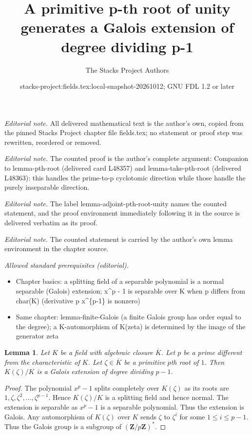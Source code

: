 \documentclass[10pt,a4paper]{amsart}
\title{A primitive p-th root of unity generates a Galois extension of degree dividing p-1}
\author{The Stacks Project Authors}
\date{stacks-project:fields.tex:local-snapshot-20261012; GNU FDL 1.2 or later}
\theoremstyle{plain}
\newtheorem{lemma}[subsection]{Lemma}
\theoremstyle{definition}
\theoremstyle{remark}
\numberwithin{equation}{subsection}
\begin{document}
\maketitle
\noindent\textit{Editorial note.} All delivered mathematical text is the author's own, copied from the pinned Stacks Project chapter file fields.tex; no statement or proof step was rewritten, reordered or removed.\par\medskip
\noindent\textit{Editorial note.} The counted proof is the author's complete argument: Companion to lemma-pth-root (delivered card L48357) and lemma-take-pth-root (delivered L48363): this handles the prime-to-p cyclotomic direction while those handle the purely inseparable direction.\par\medskip
\noindent\textit{Editorial note.} The label lemma-adjoint-pth-root-unity names the counted statement, and the proof environment immediately following it in the source is delivered verbatim as its proof.\par\medskip
\noindent\textit{Editorial note.} The counted statement is carried by the author's own lemma environment in the chapter source.\par\medskip
\noindent\textit{Allowed standard prerequisites (editorial).}\begin{itemize}
\item Chapter basics: a splitting field of a separable polynomial is a normal separable (Galois) extension; x\textasciicircum{}p - 1 is separable over K when p differs from char(K) (derivative p x\textasciicircum{}\{p-1\} is nonzero)
\item Same chapter: lemma-finite-Galois (a finite Galois group has order equal to the degree); a K-automorphism of K(zeta) is determined by the image of the generator zeta
\end{itemize}\medskip
\begin{lemma}
\label{lemma-adjoint-pth-root-unity}
Let $K$ be a field with algebraic closure $\overline{K}$.
Let $p$ be a prime different from the characteristic of $K$.
Let $\zeta \in \overline{K}$ be a primitive $p$th root
of $1$. Then $K(\zeta)/K$ is a Galois extension of degree dividing $p - 1$.
\end{lemma}

\begin{proof}
The polynomial $x^p - 1$ splits completely over
$K(\zeta)$ as its roots are $1, \zeta, \zeta^2, \ldots, \zeta^{p - 1}$.
Hence $K(\zeta)/K$ is a splitting field and hence normal.
The extension is separable as $x^p - 1$ is a separable polynomial.
Thus the extension is Galois. Any automorphism of $K(\zeta)$ over $K$
sends $\zeta$ to $\zeta^i$ for some $1 \leq i \leq p - 1$.
Thus the Galois group is a subgroup of $(\mathbf{Z}/p\mathbf{Z})^*$.
\end{proof}
\end{document}

